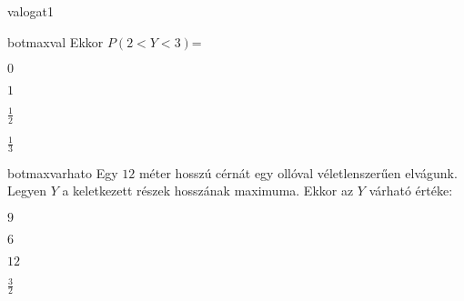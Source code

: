 \documentclass[12pt]{article}
\begin{document}
\begin{quiz}{valogat1}
\begin{multi}{botmaxval}
Ekkor $ P(2<Y<3) $=
\item* $ 0 $
\item $ 1 $
\item $ \frac{1}{2} $
\item $ \frac{1}{3} $
\end{multi}
\begin{multi}{botmaxvarhato}
Egy $ 12 $ méter hosszú cérnát egy ollóval véletlenszerűen elvágunk.
Legyen $ Y $ a keletkezett részek hosszának maximuma.
Ekkor az $ Y $ várható értéke:
\item* $ 9 $
\item $ 6 $
\item $ 12 $
\item $ \frac{3}{2} $
\end{multi}
\end{quiz}
\end{document}
